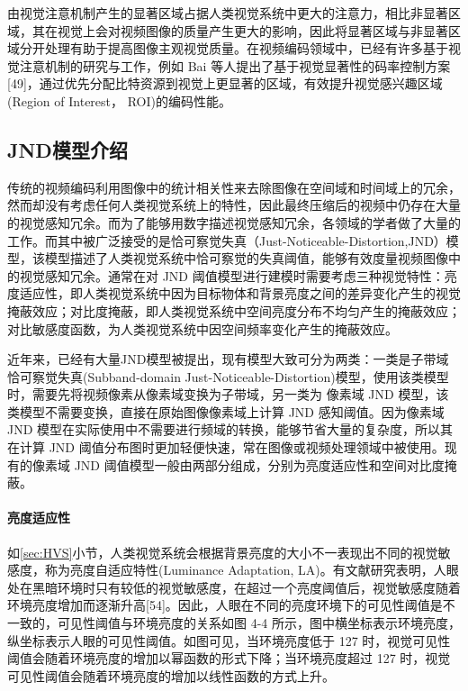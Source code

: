   由视觉注意机制产生的显著区域占据人类视觉系统中更大的注意力，相比非显著区域，其在视觉上会对视频图像的质量产生更大的影响，因此将显著区域与非显著区域分开处理有助于提高图像主观视觉质量。在视频编码领域中，已经有许多基于视觉注意机制的研究与工作，例如 Bai 等人提出了基于视觉显著性的码率控制方案[49]，通过优先分配比特资源到视觉上更显著的区域，有效提升视觉感兴趣区域(Region of Interest， ROI)的编码性能。

  \subsection{JND模型介绍}
  传统的视频编码利用图像中的统计相关性来去除图像在空间域和时间域上的冗余，然而却没有考虑任何人类视觉系统上的特性，因此最终压缩后的视频中仍存在大量的视觉感知冗余。而为了能够用数字描述视觉感知冗余，各领域的学者做了大量的工作。而其中被广泛接受的是恰可察觉失真（Just-Noticeable-Distortion,JND）模型，该模型描述了人类视觉系统中恰可察觉的失真阈值，能够有效度量视频图像中的视觉感知冗余。通常在对 JND 阈值模型进行建模时需要考虑三种视觉特性：亮度适应性，即人类视觉系统中因为目标物体和背景亮度之间的差异变化产生的视觉掩蔽效应；对比度掩蔽，即人类视觉系统中空间亮度分布不均匀产生的掩蔽效应；对比敏感度函数，为人类视觉系统中因空间频率变化产生的掩蔽效应。

  近年来，已经有大量JND模型被提出，现有模型大致可分为两类：一类是子带域恰可察觉失真(Subband-domain Just-Noticeable-Distortion)模型，使用该类模型时，需要先将视频像素从像素域变换为子带域，另一类为
  像素域 JND 模型，该类模型不需要变换，直接在原始图像像素域上计算 JND 感知阈值。因为像素域 JND 模型在实际使用中不需要进行频域的转换，能够节省大量的复杂度，所以其在计算 JND 阈值分布图时更加轻便快速，常在图像或视频处理领域中被使用。现有的像素域 JND 阈值模型一般由两部分组成，分别为亮度适应性和空间对比度掩蔽。

  \paragraph{亮度适应性} 如\ref{sec:HVS}小节，人类视觉系统会根据背景亮度的大小不一表现出不同的视觉敏感度，称为亮度自适应特性(Luminance Adaptation, LA)。有文献研究表明，人眼处在黑暗环境时只有较低的视觉敏感度，在超过一个亮度阈值后，视觉敏感度随着环境亮度增加而逐渐升高[54]。因此，人眼在不同的亮度环境下的可见性阈值是不一致的，可见性阈值与环境亮度的关系如图 4-4 所示，图中横坐标表示环境亮度，纵坐标表示人眼的可见性阈值。如图可见，当环境亮度低于 127 时，视觉可见性阈值会随着环境亮度的增加以幂函数的形式下降；当环境亮度超过 127 时，视觉可见性阈值会随着环境亮度的增加以线性函数的方式上升。

